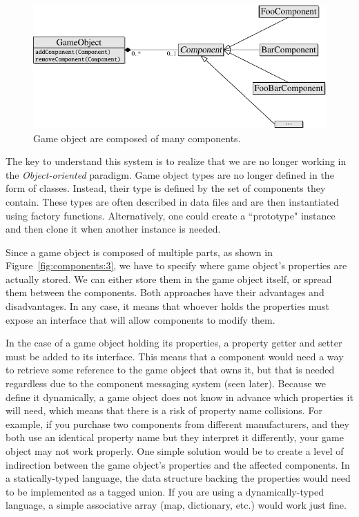 \documentclass[
    phd,
    electronic,
    letterpaper,
    simplechapterheading,
    openany,
    parttop,
    lof,
]{byumsphd}
\begin{document}
\begin{figure}[H]
\bigskip
\centering
\includegraphics[width=0.8\linewidth]{hierarchy-uml-diagrams/component-3.pdf}
\caption{Game object are composed of many components.}
\label{fig:component:3}
\end{figure}

The key to understand this system is to realize that we are no longer working in the \textit{Object-oriented} paradigm. Game object types are no longer defined in the form of classes. Instead, their type is defined by the set of components they contain. These types are often described in data files and are then instantiated using factory functions. Alternatively, one could create a ``prototype" instance and then clone it when another instance is needed.

Since a game object is composed of multiple parts, as shown in Figure~\ref{fig:components:3}, we have to specify where game object's properties are actually stored. We can either store them in the game object itself, or spread them between the components. Both approaches have their advantages and disadvantages. In any case, it means that whoever holds the properties must expose an interface that will allow components to modify them.

In the case of a game object holding its properties, a property getter and setter must be added to its interface. This means that a component would need a way to retrieve some reference to the game object that owns it, but that is needed regardless due to the component messaging system (seen later). Because we define it dynamically, a game object does not know in advance which properties it will need, which means that there is a risk of property name collisions. For example, if you purchase two components from different manufacturers, and they both use an identical property name but they interpret it differently, your game object may not work properly. One simple solution would be to create a level of indirection between the game object's properties and the affected components.  In a statically-typed language, the data structure backing the properties would need to be implemented as a tagged union. If you are using a dynamically-typed language, a simple associative array (map, dictionary, etc.) would work just fine.
\end{document}
